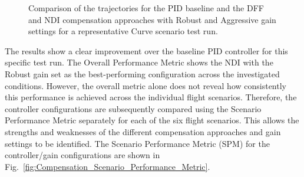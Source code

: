 \begin{figure}[htbp]
%
	\caption{Comparison of the trajectories for the PID baseline and the DFF and NDI compensation approaches with Robust and Aggressive gain settings for a representative Curve scenario test run.}
	\label{fig:Compensation_curve_trajectory}
\end{figure}

The results show a clear improvement over the baseline PID controller for this specific test run. The Overall Performance Metric shows the NDI with the Robust gain set as the best-performing configuration across the investigated conditions. However, the overall metric alone does not reveal how consistently this performance is achieved across the individual flight scenarios. Therefore, the controller configurations are subsequently compared using the Scenario Performance Metric separately for each of the six flight scenarios. This allows the strengths and weaknesses of the different compensation approaches and gain settings to be identified.
The Scenario Performance Metric (SPM) for the controller/gain configurations are shown in Fig.~\ref{fig:Compensation_Scenario_Performance_Metric}.


